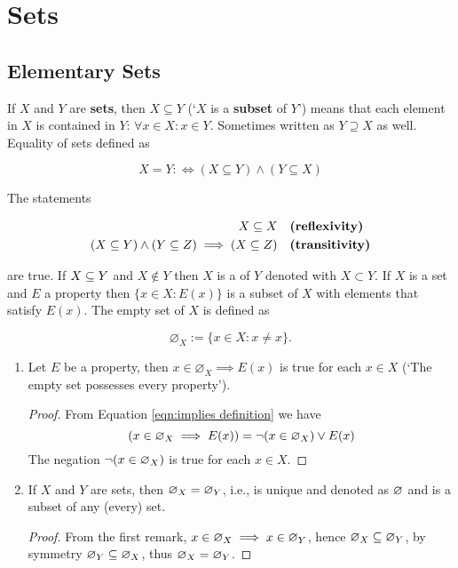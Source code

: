 \section{Sets}

\subsection{Elementary Sets}

If $X$ and $Y$ are \textbf{sets}, then $X \subseteq Y$ (`$X$ is a \textbf{subset} of $Y$') means that each element in $X$ is contained in $Y$: $\forall x \in X : x \in Y$. Sometimes written as $Y \supseteq X$ as well. Equality of sets defined as

$$
X = Y :\iff (X \subseteq Y) \land (Y \subseteq X)
$$

The statements

\begin{align*}
    X \subseteq X & && \text{\textbf{(reflexivity)}\index{set!reflexivity}}\\
    (X \subseteq Y) \land (Y \subseteq Z) \implies (X \subseteq Z) & && \text{\textbf{(transitivity)}\index{set!transitivity}}
\end{align*}

\noindent are true. If $X \subseteq Y$ and $X \not\in Y$ then $X$ is a  of $Y$ denoted with $X \subset Y$. If $X$ is a set and $E$ a property then $\{x \in X: E(x)\}$ is a subset of $X$ with elements that satisfy $E(x)$. The empty set of $X$ is defined as

$$
\varnothing_X := \{x \in X : x \neq x\}.
$$

\begin{remark}
    \begin{enumerate}[label=(\alph*)]
        \item Let $E$ be a property, then $x \in \varnothing_X \implies E(x)$ is true for each $x \in X$ (`The empty set possesses every property').
            \begin{proof}
                From Equation \ref{eqn:implies definition} we have
                $$
                (x \in \varnothing_X \implies E(x)) = \neg(x \in \varnothing_X) \lor E(x)
                $$
                The negation $\neg (x \in \varnothing_X)$ is true for each $x \in X$.
            \end{proof}
        \item If $X$ and $Y$ are sets, then $\varnothing_X = \varnothing_Y$, i.e.,  is unique and denoted as $\varnothing$ and is a subset of any (every) set.
            \begin{proof}
                From the first remark, $x \in \varnothing_X \implies x \in \varnothing_Y$, hence $\varnothing_X \subseteq \varnothing_Y$, by symmetry $\varnothing_Y \subseteq \varnothing_X$, thus $\varnothing_X = \varnothing_Y$.
            \end{proof}
    \end{enumerate}
\end{remark}

